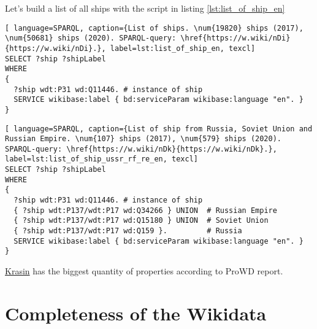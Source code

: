 Let's build a list of all ships with the script in listing \ref{lst:list_of_ship_en}


\begin{lstlisting}[ language=SPARQL, caption={List of ships. \num{19820} ships (2017), \num{50681} ships (2020). SPARQL-query: \href{https://w.wiki/nDi}{https://w.wiki/nDi}.}, label=lst:list_of_ship_en, texcl]
SELECT ?ship ?shipLabel
WHERE
{
  ?ship wdt:P31 wd:Q11446. # instance of ship
  SERVICE wikibase:label { bd:serviceParam wikibase:language "en". }
}
\end{lstlisting}

\label{question:ship_1}
  
\begin{lstlisting}[ language=SPARQL, caption={List of ship from Russia, Soviet Union and Russian Empire. \num{107} ships (2017), \num{579} ships (2020). SPARQL-query: \href{https://w.wiki/nDk}{https://w.wiki/nDk}.}, label=lst:list_of_ship_ussr_rf_re_en, texcl]
SELECT ?ship ?shipLabel
WHERE
{
  ?ship wdt:P31 wd:Q11446. # instance of ship
  { ?ship wdt:P137/wdt:P17 wd:Q34266 } UNION  # Russian Empire
  { ?ship wdt:P137/wdt:P17 wd:Q15180 } UNION  # Soviet Union
  { ?ship wdt:P137/wdt:P17 wd:Q159 }.         # Russia
  SERVICE wikibase:label { bd:serviceParam wikibase:language "en". }
}
\end{lstlisting}

\href{https://www.wikidata.org/wiki/Q281147}{Krasin} has the biggest quantity of properties according to ProWD report.
  


\section{Completeness of the Wikidata}

\begin{marginfigure}[0.0cm]
  {
    \setlength{\fboxsep}{0pt}%
    \setlength{\fboxrule}{1pt}%
  }
  \caption[Graph of Wikidata objects' completeness]{Graph of \href{https://www.wikidata.org/wiki/Q11446}{ship (Q11446)} Wikidata objects' completeness. Gini coefficient equals 0.239. Data was collected with ProWD.id, 2020. The graph and Gini coefficient show that completeness is not uniform.}%
  \label{fig:prowd_ships-unbalanced}%
\end{marginfigure}

